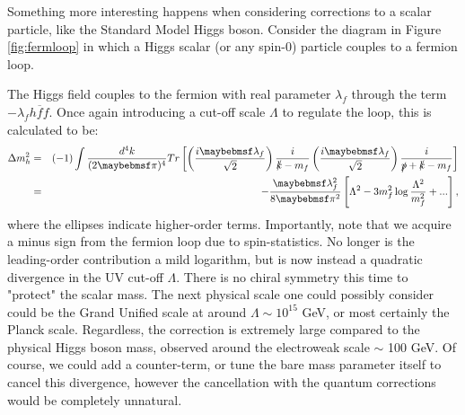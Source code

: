 \begin{itemize}
Something more interesting happens when considering corrections to a scalar particle, like the Standard Model Higgs boson. Consider the diagram in Figure \ref{fig:fermloop} in which a Higgs scalar (or any spin-0) particle couples to a fermion loop.
\begin{center}
\vspace{5mm}
\label{fig:fermloop}
\end{center}
The Higgs field couples to the fermion with real parameter $\lambda_{f}$ through the term $-\lambda_{f}h\overline{f}f$. Once again introducing a cut-off scale $\Lambda$ to regulate the loop, this is calculated to be:
\begin{eqnarray}
\Delta m^2_{h}&=&(-1)\int{\frac{d^{4}k}{(2\pi)^4}Tr\left[ \left(\frac{i\lambda_{f}}{\sqrt{2}}\right) \frac{i}{\slashed{k}-m_{f}} \left(\frac{i\lambda_{f}}{\sqrt{2}}\right) \frac{i}{\slashed{p}+\slashed{k}-m_{f}} \right]} \nonumber \\
&=&-\frac{\lambda^2_{f}}{8\pi^2}\left[\Lambda^2-3m^2_{f}\log\frac{\Lambda^2}{m_{f}^2}+...\right],
\end{eqnarray}
where the ellipses indicate higher-order terms. Importantly, note that we acquire a minus sign from the fermion loop due to spin-statistics. No longer is the leading-order contribution a mild logarithm, but is now instead a quadratic divergence in the UV cut-off $\Lambda$. There is no chiral symmetry this time to "protect" the scalar mass. The next physical scale one could possibly consider could be the Grand Unified scale at around $\Lambda \sim 10^{15}$ GeV, or most certainly the Planck scale. Regardless, the correction is extremely large compared to the physical Higgs boson mass, observed around the electroweak scale $\sim$ 100 GeV. Of course, we could add a counter-term, or tune the bare mass parameter itself to cancel this divergence, however the cancellation with the quantum corrections would be completely unnatural.


\end{itemize}
